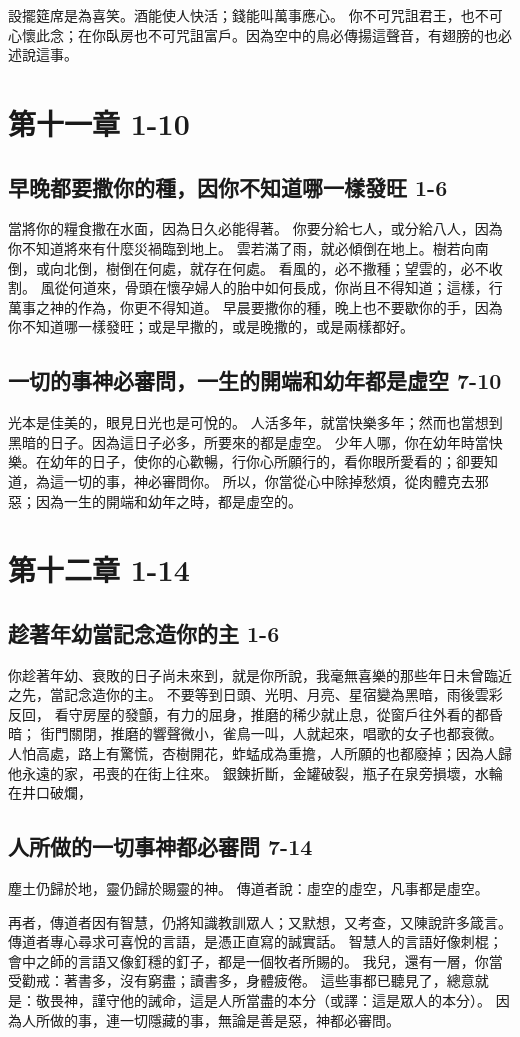 設擺筵席是為喜笑。酒能使人快活；錢能叫萬事應心。
你不可咒詛君王，也不可心懷此念；在你臥房也不可咒詛富戶。因為空中的鳥必傳揚這聲音，有翅膀的也必述說這事。


\section{第十一章   1-10}
\subsection{早晚都要撒你的種，因你不知道哪一樣發旺 1-6}
當將你的糧食撒在水面，因為日久必能得著。
你要分給七人，或分給八人，因為你不知道將來有什麼災禍臨到地上。
雲若滿了雨，就必傾倒在地上。樹若向南倒，或向北倒，樹倒在何處，就存在何處。
看風的，必不撒種；望雲的，必不收割。
風從何道來，骨頭在懷孕婦人的胎中如何長成，你尚且不得知道；這樣，行萬事之神的作為，你更不得知道。
早晨要撒你的種，晚上也不要歇你的手，因為你不知道哪一樣發旺；或是早撒的，或是晚撒的，或是兩樣都好。

\subsection{一切的事神必審問，一生的開端和幼年都是虛空 7-10}
光本是佳美的，眼見日光也是可悅的。
人活多年，就當快樂多年；然而也當想到黑暗的日子。因為這日子必多，所要來的都是虛空。
少年人哪，你在幼年時當快樂。在幼年的日子，使你的心歡暢，行你心所願行的，看你眼所愛看的；卻要知道，為這一切的事，神必審問你。
所以，你當從心中除掉愁煩，從肉體克去邪惡；因為一生的開端和幼年之時，都是虛空的。


\section{第十二章   1-14}
\subsection{趁著年幼當記念造你的主 1-6}
你趁著年幼、衰敗的日子尚未來到，就是你所說，我毫無喜樂的那些年日未曾臨近之先，當記念造你的主。
不要等到日頭、光明、月亮、星宿變為黑暗，雨後雲彩反回，
看守房屋的發顫，有力的屈身，推磨的稀少就止息，從窗戶往外看的都昏暗；
街門關閉，推磨的響聲微小，雀鳥一叫，人就起來，唱歌的女子也都衰微。
人怕高處，路上有驚慌，杏樹開花，蚱蜢成為重擔，人所願的也都廢掉；因為人歸他永遠的家，弔喪的在街上往來。
銀鍊折斷，金罐破裂，瓶子在泉旁損壞，水輪在井口破爛，

\subsection{人所做的一切事神都必審問 7-14}
塵土仍歸於地，靈仍歸於賜靈的神。
傳道者說：虛空的虛空，凡事都是虛空。

再者，傳道者因有智慧，仍將知識教訓眾人；又默想，又考查，又陳說許多箴言。
傳道者專心尋求可喜悅的言語，是憑正直寫的誠實話。
智慧人的言語好像刺棍；會中之師的言語又像釘穩的釘子，都是一個牧者所賜的。
我兒，還有一層，你當受勸戒：著書多，沒有窮盡；讀書多，身體疲倦。
這些事都已聽見了，總意就是：敬畏神，謹守他的誡命，這是人所當盡的本分（或譯：這是眾人的本分）。
因為人所做的事，連一切隱藏的事，無論是善是惡，神都必審問。







